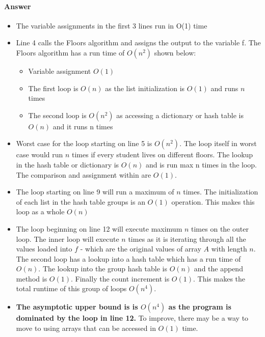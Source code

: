 \documentclass[11pt]{article}
\begin{document}
\begin{enumerate}
\begin{enumerate}
    \color{teal}
    \paragraph*{Answer}
    \begin{itemize}
        \item The variable assignments in the first 3 lines run in O(1) time
        \item Line 4 calls the Floors algorithm and assigns the output to the variable f. The Floors algorithm has a run time of $O\left( n^2 \right) $ shown below:
            \begin{itemize}
                \item Variable assignment $O\left( 1 \right) $
                \item The first loop is $O\left( n \right) $ as the list initialization is $O\left( 1 \right) $  and runs $n$ times 
                \item The second loop is $O\left( n^2 \right) $ as accessing a dictionary or hash table is $O\left( n \right) $ and it runs n times
            \end{itemize}
        \item Worst case for the loop starting on line 5 is $O\left( n^2 \right)$. The loop itself in worst case would run $n$ times if every student lives on different floors. The lookup in the hash table or dictionary is $O\left( n \right) $ and is run max n times in the loop. The comparison and assignment within are $O\left( 1 \right) $.
        \item The loop starting on line 9 will run a maximum of $n$ times. The initialization of each list in the hash table groups is an $O\left( 1 \right) $ operation. This makes this loop as a whole $O\left( n \right) $
        \item The loop beginning on line 12 will execute maximum $n$ times on the outer loop. The inner loop will execute $n$ times as it is iterating through all the values loaded into $f$ - which are the original values of array $A$ with length $n$. The second loop has a lookup into a hash table which has a run time of $O\left( n \right) $. The lookup into the group hash table is $O\left( n \right) $ and the append method is $O\left( 1 \right) $. Finally the count increment is $O\left( 1 \right) $. This makes the total runtime of this group of loops $O\left( n^4 \right) $.
        \item \textbf{The asymptotic upper bound is is $O\left( n^4 \right)$ as the program is dominated by the loop in line 12.} To improve, there may be a way to move to using arrays that can be accessed in $O\left( 1 \right) $ time.
    \end{itemize}

    
    
\end{enumerate}
\end{enumerate}
\end{document}
